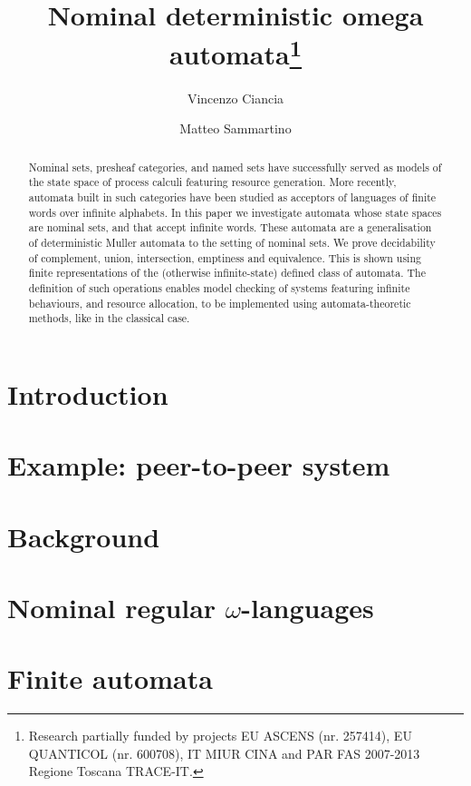 \documentclass[orivec]{llncs}
\title{Nominal deterministic omega automata\thanks{Research partially funded by projects EU 
ASCENS (nr. 257414), EU QUANTICOL (nr. 600708), 
IT MIUR CINA and PAR FAS 2007-2013 Regione Toscana TRACE-IT.}
}
\author{Vincenzo Ciancia\inst{1} \and Matteo Sammartino\inst{2}}
\institute{ISTI-CNR, Pisa \and Dipartimento di Informatica, Universit\`a di Pisa, Pisa }
\begin{document}
\maketitle

\begin{abstract}
 Nominal sets, presheaf categories, and named sets have successfully served as models of the state space of process calculi featuring resource generation. More recently, automata built in such categories have been studied as acceptors of languages of finite words over infinite alphabets. In this paper we investigate automata whose state spaces are nominal sets, and that accept infinite words. These automata are a generalisation of deterministic Muller automata to the setting of nominal sets. 
 We prove decidability of complement, union, intersection, emptiness and equivalence. This is shown using finite representations of the (otherwise infinite-state) defined class of automata. The definition of such operations enables model checking of systems featuring infinite behaviours, and resource allocation, to be implemented using automata-theoretic methods, like in the classical case.
\end{abstract}

\section{Introduction}\label{sec:introduction}

\section{Example: peer-to-peer system}\label{sec:example}


\section{Background}\label{sec:background}

\section{Nominal regular \texorpdfstring{$\omega$}{omega}-languages}\label{sec:languages}


\section{Finite automata}\label{sec:hd-automata}

\end{document}
